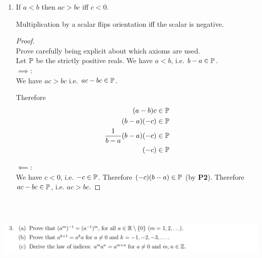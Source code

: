 \documentclass[12pt]{article}
\begin{document}
\begin{enumerate}[label=(\alph*)]
\item
  \begin{theorem*}
    If $a < b$ then $ac > bc$ iff $c < 0$.
  \end{theorem*}
  \begin{intuition*}
    Multiplication by a scalar flips orientation iff the scalar is negative.
  \end{intuition*}
  \begin{proof}~\\
     Prove carefully being explicit about which axioms are used.\\
    Let $\P$ be the strictly positive reals. We have $a < b$, i.e. $b - a \in \P$.\\
    $\implies$:\\
    We have $ac > bc$ i.e. $ac - bc \in \P$.

    Therefore
    \begin{align*}
      (a - b)c &\in \P\\
      (b - a)(-c) &\in \P\\
      \frac{1}{b-a}(b - a)(-c) &\in \P\\
      (-c) &\in \P
    \end{align*}

    $\impliedby$:\\
    We have $c < 0$, i.e. $-c \in \P$. Therefore $(-c)(b - a) \in \P$ (by {\bf P2}). Therefore
    $ac - bc \in \P$, i.e. $ac > bc$.
  \end{proof}
\end{enumerate}~\\

\newpage
\subsection{}
\begin{mdframed}
\includegraphics[width=400pt]{img/oxford-prelims-M2-analysis-I-sheet-1-3.png}
\end{mdframed}
\newpage
\end{document}

